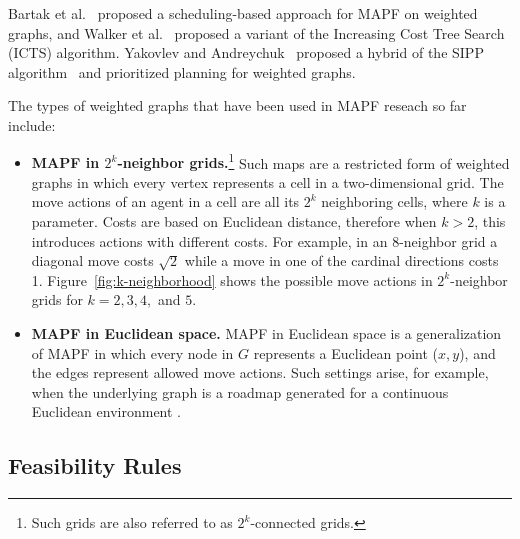 \documentclass[letterpaper]{article} %
\newcommand{\mapf}{\ac{MAPF}\xspace}
\newcommand{\comment}[1]{{\nb{\textbf{Comment:}}{orange}{#1}}}
\begin{document}
Bartak et al.~ proposed a scheduling-based approach for \mapf on weighted graphs, and Walker et al.~ proposed a variant of the Increasing Cost Tree Search (ICTS) algorithm. Yakovlev and Andreychuk~ proposed a hybrid of the SIPP algorithm~\cite{phillips2011sipp} and prioritized planning for weighted graphs. 

The types of weighted graphs that have been used in MAPF reseach so far include: 
\begin{itemize}
    \item \textbf{MAPF in $2^k$-neighbor grids.}\footnote{Such grids are also referred to as $2^k$-connected grids.} Such maps are a restricted form of weighted graphs in which every vertex represents a cell in a two-dimensional grid. The move actions of an agent in a cell are all its $2^k$ neighboring cells, where $k$ is a parameter.
Costs are based on Euclidean distance, therefore when $k>2$, this introduces actions with different costs. For example, in an 8-neighbor grid a diagonal move costs $\sqrt{2}$ while a move in one of the cardinal directions costs 1. Figure~\ref{fig:k-neighborhood} shows the possible move actions in $2^k$-neighbor grids for $k=2, 3, 4,$ and $5$. 


    \item \textbf{MAPF in Euclidean space.} 
\mapf in Euclidean space is a generalization of \mapf in which every node in $G$ represents a Euclidean point ($x,y$), and the edges represent allowed move actions. Such settings arise, for example, when the underlying graph is a roadmap generated for a continuous Euclidean environment \cite{khatib1986real,wagner2012probabilistic}. 

\end{itemize} 


\subsection{Feasibility Rules}
\end{document}
